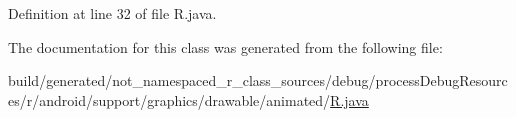 Definition at line 32 of file R.\+java.



The documentation for this class was generated from the following file\+:\begin{DoxyCompactItemize}
\item 
build/generated/not\+\_\+namespaced\+\_\+r\+\_\+class\+\_\+sources/debug/process\+Debug\+Resources/r/android/support/graphics/drawable/animated/\mbox{\hyperlink{android_2support_2graphics_2drawable_2animated_2_r_8java}{R.\+java}}\end{DoxyCompactItemize}
